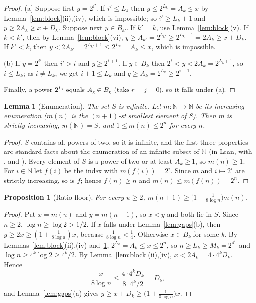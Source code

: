 \documentclass[11pt]{amsart}
\theoremstyle{plain}
\newtheorem{lemma}[theorem]{Lemma}
\newtheorem{proposition}[theorem]{Proposition}
\theoremstyle{definition}
\newcommand{\N}{\mathbb{N}}
\begin{document}
\begin{proof}
(a) Suppose first $y=2^{i'}$. If $i'\le L_k$ then $y\le2^{L_k}=A_k\le x$ by Lemma~\ref{lem:block}(ii),(iv), which is impossible; so $i'\ge L_k+1$ and $y\ge2A_k\ge x+D_k$. Suppose next $y\in B_{k'}$. If $k'=k$, use Lemma~\ref{lem:block}(v). If $k<k'$, then by Lemma~\ref{lem:block}(vi), $y\ge A_{k'}=2^{L_{k'}}\ge2^{L_k+1}=2A_k\ge x+D_k$. If $k'<k$, then $y<2A_{k'}=2^{L_{k'}+1}\le2^{L_k}=A_k\le x$, which is impossible.

(b) If $y=2^{i'}$ then $i'>i$ and $y\ge2^{i+1}$. If $y\in B_k$ then $2^i<y<2A_k=2^{L_k+1}$, so $i\le L_k$; as $i\ne L_k$, we get $i+1\le L_k$ and $y\ge A_k=2^{L_k}\ge2^{i+1}$.

Finally, a power $2^{L_k}$ equals $A_k\in B_k$ (take $r=j=0$), so it falls under (a).
\end{proof}

\begin{lemma}[Enumeration]\label{lem:enum}
The set $S$ is infinite. Let $m\colon\N\to\N$ be its increasing enumeration ($m(n)$ is the $(n+1)$-st smallest element of $S$). Then $m$ is strictly increasing, $m(\N)=S$, and $1\le m(n)\le2^n$ for every $n$.
\end{lemma}

\begin{proof}
$S$ contains all powers of two, so it is infinite, and the first three properties are standard facts about the enumeration of an infinite subset of $\N$ (in Lean,  with ,  and ).
Every element of $S$ is a power of two or at least $A_k\ge1$, so $m(n)\ge1$.
For $i\in\N$ let $f(i)$ be the index with $m(f(i))=2^i$. Since $m$ and $i\mapsto2^i$ are strictly increasing, so is $f$; hence $f(n)\ge n$ and $m(n)\le m(f(n))=2^n$.
\end{proof}

\begin{proposition}[Ratio floor]\label{prop:ratio}
For every $n\ge2$, $m(n+1)\ge\bigl(1+\frac{1}{8\log n}\bigr)m(n)$.
\end{proposition}

\begin{proof}
Put $x=m(n)$ and $y=m(n+1)$, so $x<y$ and both lie in $S$. Since $n\ge2$, $\log n\ge\log2>1/2$.
If $x$ falls under Lemma~\ref{lem:gaps}(b), then $y\ge2x\ge(1+\frac1{8\log n})x$, because $\frac1{8\log n}<\frac14$.
Otherwise $x\in B_k$ for some $k$. By Lemmas~\ref{lem:block}(ii),(iv) and~\ref{lem:enum}, $2^{L_k}=A_k\le x\le2^n$, so $n\ge L_k\ge M_k=2^{4^k}$ and $\log n\ge4^k\log2\ge4^k/2$. By Lemma~\ref{lem:block}(ii),(iv), $x<2A_k=4\cdot4^kD_k$. Hence
\[
  \frac{x}{8\log n}\le\frac{4\cdot4^kD_k}{8\cdot4^k/2}=D_k,
\]
and Lemma~\ref{lem:gaps}(a) gives $y\ge x+D_k\ge\bigl(1+\frac1{8\log n}\bigr)x$.
\end{proof}
\end{document}
